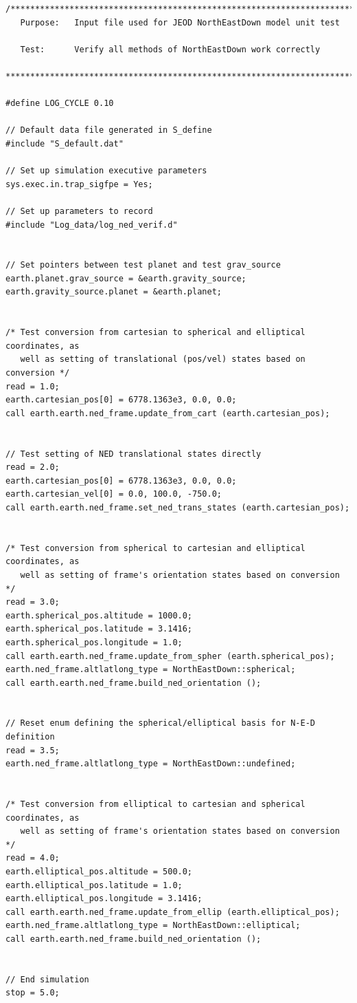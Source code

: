 \documentclass[twoside,11pt,titlepage]{report}
\begin{document}
\begin{verbatim}
/*******************************************************************************
   Purpose:   Input file used for JEOD NorthEastDown model unit test

   Test:      Verify all methods of NorthEastDown work correctly

*******************************************************************************/

#define LOG_CYCLE 0.10

// Default data file generated in S_define
#include "S_default.dat"

// Set up simulation executive parameters
sys.exec.in.trap_sigfpe = Yes;

// Set up parameters to record
#include "Log_data/log_ned_verif.d"


// Set pointers between test planet and test grav_source
earth.planet.grav_source = &earth.gravity_source;
earth.gravity_source.planet = &earth.planet;


/* Test conversion from cartesian to spherical and elliptical coordinates, as
   well as setting of translational (pos/vel) states based on conversion */
read = 1.0;
earth.cartesian_pos[0] = 6778.1363e3, 0.0, 0.0;
call earth.earth.ned_frame.update_from_cart (earth.cartesian_pos);


// Test setting of NED translational states directly
read = 2.0;
earth.cartesian_pos[0] = 6778.1363e3, 0.0, 0.0;
earth.cartesian_vel[0] = 0.0, 100.0, -750.0;
call earth.earth.ned_frame.set_ned_trans_states (earth.cartesian_pos);


/* Test conversion from spherical to cartesian and elliptical coordinates, as
   well as setting of frame's orientation states based on conversion */
read = 3.0;
earth.spherical_pos.altitude = 1000.0;
earth.spherical_pos.latitude = 3.1416;
earth.spherical_pos.longitude = 1.0;
call earth.earth.ned_frame.update_from_spher (earth.spherical_pos);
earth.ned_frame.altlatlong_type = NorthEastDown::spherical;
call earth.earth.ned_frame.build_ned_orientation ();


// Reset enum defining the spherical/elliptical basis for N-E-D definition
read = 3.5;
earth.ned_frame.altlatlong_type = NorthEastDown::undefined;


/* Test conversion from elliptical to cartesian and spherical coordinates, as
   well as setting of frame's orientation states based on conversion */
read = 4.0;
earth.elliptical_pos.altitude = 500.0;
earth.elliptical_pos.latitude = 1.0;
earth.elliptical_pos.longitude = 3.1416;
call earth.earth.ned_frame.update_from_ellip (earth.elliptical_pos);
earth.ned_frame.altlatlong_type = NorthEastDown::elliptical;
call earth.earth.ned_frame.build_ned_orientation ();


// End simulation
stop = 5.0;

\end{verbatim}



\newpage
{}


\end{document}
